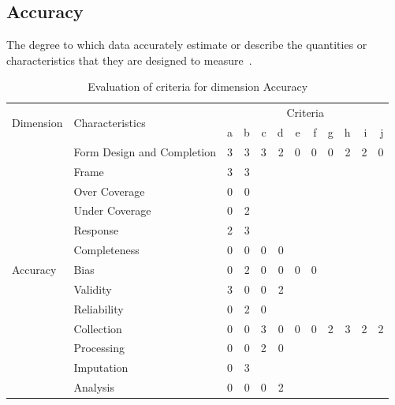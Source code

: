 \subsection{Accuracy}

The degree to which data accurately estimate or describe the quantities or characteristics that they are designed to measure~\cite{oecd}.

\begin{table}[htbp]
    \centering

    \begin{tabular}{llrrrrrrrrrr}
        \toprule
        \multirow{2}{*}{Dimension}  & \multirow{2}{*}{Characteristics}  & \multicolumn{10}{c}{Criteria}         \\ \cmidrule(lr){3-12}
                                    &                                   & a & b & c & d & e & f & g & h & i & j \\ \midrule
        \multirow{13}{*}{Accuracy}  & Form Design and Completion        & 3 & 3 & 3 & 2 & 0 & 0 & 0 & 2 & 2 & 0 \\
                                    & Frame                             & 3 & 3 &   &   &   &   &   &   &   &   \\
                                    & Over Coverage                     & 0 & 0 &   &   &   &   &   &   &   &   \\
                                    & Under Coverage                    & 0 & 2 &   &   &   &   &   &   &   &   \\
                                    & Response                          & 2 & 3 &   &   &   &   &   &   &   &   \\
                                    & Completeness                      & 0 & 0 & 0 & 0 &   &   &   &   &   &   \\
                                    & Bias                              & 0 & 2 & 0 & 0 & 0 & 0 &   &   &   &   \\
                                    & Validity                          & 3 & 0 & 0 & 2 &   &   &   &   &   &   \\
                                    & Reliability                       & 0 & 2 & 0 &   &   &   &   &   &   &   \\
                                    & Collection                        & 0 & 0 & 3 & 0 & 0 & 0 & 2 & 3 & 2 & 2 \\
                                    & Processing                        & 0 & 0 & 2 & 0 &   &   &   &   &   &   \\
                                    & Imputation                        & 0 & 3 &   &   &   &   &   &   &   &   \\
                                    & Analysis                          & 0 & 0 & 0 & 2 &   &   &   &   &   &   \\
        \bottomrule
    \end{tabular}

    \caption{Evaluation of criteria for dimension Accuracy}
    \label{table:accuracy-benchmark}
\end{table}
\FloatBarrier

